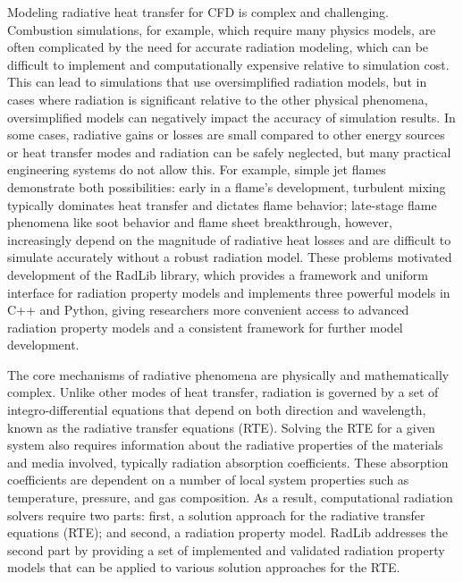 \documentclass[preprint,12pt]{elsarticle}
\begin{document}
Modeling radiative heat transfer for CFD is complex and challenging. Combustion simulations, for example, which require many physics models, are often complicated by the need for accurate radiation modeling, which can be difficult to implement and computationally expensive relative to simulation cost. This can lead to simulations that use oversimplified radiation models, but in cases where radiation is significant relative to the other physical phenomena, oversimplified models can negatively impact the accuracy of simulation results. In some cases, radiative gains or losses are small compared to other energy sources or heat transfer modes and radiation can be safely neglected, but many practical engineering systems do not allow this. For example, simple jet flames demonstrate both possibilities: early in a flame's development, turbulent mixing typically dominates heat transfer and dictates flame behavior; late-stage flame phenomena like soot behavior and flame sheet breakthrough, however, increasingly depend on the magnitude of radiative heat losses and are difficult to simulate accurately without a robust radiation model. These problems motivated development of the RadLib library, which provides a framework and uniform interface for radiation property models and implements three powerful models in C++ and Python, giving researchers more convenient access to advanced radiation property models and a consistent framework for further model development. 

The core mechanisms of radiative phenomena are physically and mathematically complex. Unlike other modes of heat transfer, radiation is governed by a set of integro-differential equations that depend on both direction and wavelength, known as the radiative transfer equations (RTE). Solving the RTE for a given system also requires information about the radiative properties of the materials and media involved, typically radiation absorption coefficients. These absorption coefficients are dependent on a number of local system properties such as temperature, pressure, and gas composition. As a result, computational radiation solvers require two parts: first, a solution approach for the radiative transfer equations (RTE); and second, a radiation property model. RadLib addresses the second part by providing a set of implemented and validated radiation property models that can be applied to various solution approaches for the RTE.

\end{document}
